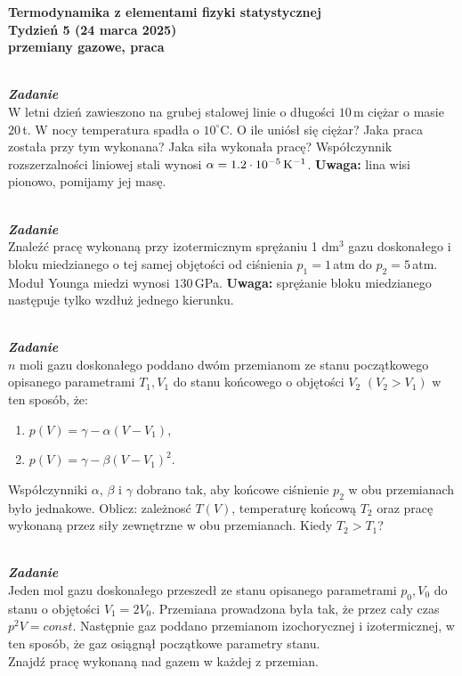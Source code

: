 \documentclass[11pt,a4paper]{article}
\newcounter{zadanie}\newcommand{\zadanie}[1][]{\addtocounter{zadanie}{1} ~\\  {\bf \emph{Zadanie \arabic{zadanie} #1 }} \\}
\renewcommand{\t}[1]{\textrm{#1}}
\begin{document}

\begin{centering}
\bf{\Large{Termodynamika z elementami fizyki statystycznej}}\\
Tydzień 5  (24 marca 2025)\\[3mm]
przemiany gazowe, praca \\
\end{centering}
\vspace{5mm}

\zadanie
W letni dzień zawieszono na grubej stalowej linie o długości $10\,$m ciężar o masie $20\,$t.
W nocy temperatura spadła o $10^\circ$C. O ile uniósł się ciężar?
Jaka praca została przy tym wykonana? Jaka siła wykonała pracę?
Współczynnik rozszerzalności liniowej stali wynosi $\alpha = 1.2\cdot 10^{-5}\,{\rm K}^{-1}$.
\vskip 10pt
\textbf{Uwaga: }lina wisi pionowo, pomijamy jej masę.


\zadanie
Znaleźć pracę wykonaną przy izotermicznym sprężaniu 1 dm$^3$
gazu doskonałego i bloku miedzianego o tej samej objętości od
ciśnienia $p_1=1\,$atm do $p_2=5\,$atm. Moduł Younga miedzi wynosi $130\,$GPa.
\vskip 10pt
\textbf{Uwaga:} sprężanie bloku miedzianego następuje tylko wzdłuż jednego kierunku.


\zadanie
$n$ moli gazu doskonałego poddano dwóm przemianom ze stanu początkowego
opisanego parametrami $T_1, V_1$ do stanu końcowego o objętości $V_2$
$(V_2>V_1)$ w ten
sposób, że:\begin{enumerate}
\item $p(V) = \gamma - \alpha (V-V_1)$,
\item $p(V) = \gamma - \beta (V-V_1)^2$.
\end{enumerate}
Współczynniki $\alpha$, $\beta$ i $\gamma$ dobrano tak,
aby końcowe ciśnienie $p_2$ w obu przemianach było jednakowe.
Oblicz: zależnosć $T(V)$, temperaturę końcową $T_2$
oraz pracę wykonaną przez siły zewnętrzne w obu przemianach.
Kiedy $T_2>T_1$?

\vskip 10pt


\zadanie
Jeden mol gazu doskonałego przeszedł ze stanu opisanego parametrami
$p_0, V_0$ do stanu o objętości $V_1 = 2 V_0$.
Przemiana prowadzona była tak, że przez cały czas $p^2 V = const$.
Następnie gaz poddano przemianom izochorycznej i izotermicznej, w ten sposób, że gaz osiągnął
początkowe parametry stanu. \\
Znajdź pracę wykonaną nad gazem w każdej z przemian.
\end{document}
